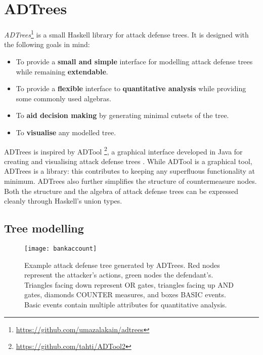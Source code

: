 \documentclass{scrreprt}
\begin{document}

\section{ADTrees}

\textit{ADTrees}\footnote{\url{https://github.com/umazalakain/adtrees}}
is a small Haskell library for attack defense trees. It is designed with the
following goals in mind:

\begin{itemize}
    \item To provide a \textbf{small and simple} interface for modelling attack
        defense trees while remaining \textbf{extendable}. 
    \item To provide a \textbf{flexible} interface to \textbf{quantitative
        analysis} while providing some commonly used algebras.
    \item To \textbf{aid decision making} by generating minimal cutsets of the
        tree.
    \item To \textbf{visualise} any modelled tree.
\end{itemize}

ADTrees is inspired by ADTool \footnote{\url{https://github.com/tahti/ADTool2}},
a graphical interface developed in Java for creating and visualising attack
defense trees \cite{KordyTool}. While ADTool is a graphical tool, ADTrees is a
library: this contributes to keeping any superfluous functionality at minimum.
ADTrees also further simplifies the structure of countermeasure nodes. Both the
structure and the algebra of attack defense trees can be expressed cleanly
through Haskell's union types.

\subsection{Tree modelling}

\begin{figure}[h!]
    \label{example-adt}
    \centering
    \texttt{[image: bankaccount]}
    \caption{Example attack defense tree generated by ADTrees. Red nodes
    represent the attacker's actions, green nodes the defendant's. Triangles
    facing down represent OR gates, triangles facing up AND gates, diamonds
    COUNTER measures, and boxes BASIC events.  Basic events contain multiple
    attributes for quantitative analysis.}
\end{figure}
\end{document}
